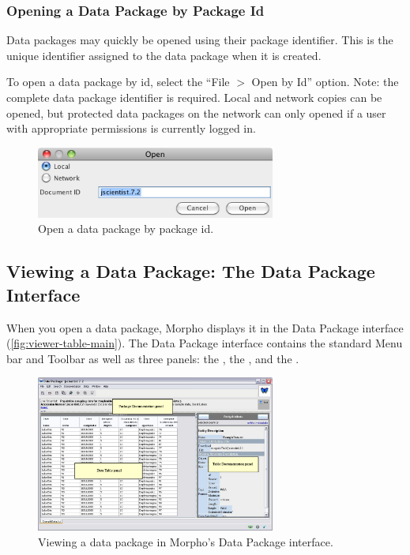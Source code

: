 \subsubsection{Opening a Data Package by Package Id}

Data packages may quickly be opened using their package identifier.
This is the unique identifier assigned to the data package when it is created.

To open a data package by id, select the ``File $>$ Open by Id'' option. 
Note: the complete data package identifier is required.
Local and network copies can be opened, but protected data packages on the 
network can only opened if a user with appropriate permissions is currently logged in.

\begin{figure}
  \centering
    \includegraphics[width=0.7\textwidth]{images/open-by-id.png}
  \caption{Open a data package by package id.}
  \label{fig:open-by-id}
\end{figure}

\subsection{Viewing a Data Package: The Data Package Interface}

When you open a data package, Morpho displays it in the Data Package
interface (\autoref{fig:viewer-table-main}). The Data Package interface
contains the standard Menu bar and Toolbar as well as three panels: the
, the , and the
.

\begin{figure}
  \centering
    \includegraphics[width=0.7\textwidth]{images/viewer-table-main.jpg}
  \caption{Viewing a data package in Morpho's Data Package interface.}
  \label{fig:viewer-table-main}
\end{figure}


